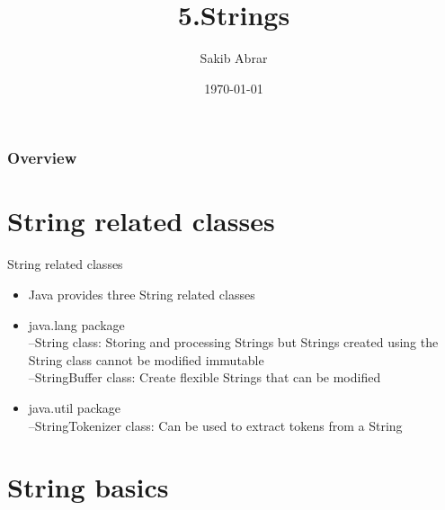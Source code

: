 \documentclass{beamer}
\title[Strings]{5.Strings} %
\author{Sakib Abrar} %
\institute[BUET] %
{
CSE\\~\\Bangladesh University of Engineering \& Technology \\ %
\medskip
\textit{sakib.cghs@gmail.com} %
}
\date{\today} %
\begin{document}
\begin{frame}
\titlepage %
\end{frame}

\begin{frame}
\frametitle{Overview} %
\tableofcontents %
\end{frame}


\section{String related classes}


\begin{frame}[fragile]{String related classes}
\begin{itemize}
\item Java provides three String related classes
\item java.lang package\\
–String class: Storing and processing Strings but Strings
created using the String class cannot be modified
immutable\\
–StringBuffer class: Create flexible Strings that can be
modified\\
\item java.util package\\
–StringTokenizer class: Can be used to extract tokens from a
String
\end{itemize}
\end{frame}

\section{String basics}
\end{document}
